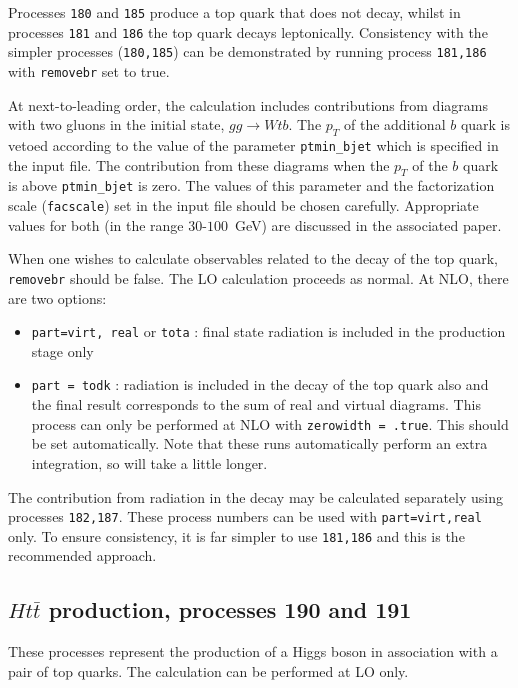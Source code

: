 \documentclass[12pt]{article}
\begin{document}
Processes {\tt 180} and {\tt 185} produce a top quark that does not decay,
whilst in processes {\tt 181} and {\tt 186} the top quark decays leptonically.
Consistency with
the simpler processes ({\tt 180,185}) can be demonstrated by running process
{\tt 181,186} with {\tt removebr} set to true.

At next-to-leading order, the calculation includes contributions from diagrams
with two gluons in the initial state, $gg \rightarrow Wtb$. The $p_T$ of the
additional $b$ quark is vetoed according to the value of the parameter
{\tt ptmin\_bjet} which is specified in the input file. The contribution from
these diagrams when the $p_T$ of the $b$ quark is above {\tt ptmin\_bjet}
is zero. The values of this parameter and the factorization scale ({\tt facscale})
set in the input file should be chosen carefully. Appropriate values for both
(in the range $30$-$100$~GeV) are discussed in the associated paper.

When one wishes to calculate observables related to the decay of the top
quark, {\tt removebr} should be false.
The LO calculation proceeds as normal. At NLO, there are two options:
\begin{itemize}
\item {\tt part=virt, real} or {\tt tota} : final state radiation is included
in the production stage only
\item {\tt part = todk} : radiation is included in the decay of the top
quark also and the final result corresponds to the sum of real and virtual
diagrams. This process can only be performed at NLO with 
{\tt zerowidth = .true}. This should be set automatically.
Note that these runs automatically perform an extra integration, so
will take a little longer.
\end{itemize}

The contribution from radiation in the decay may be calculated separately using
processes {\tt 182,187}. These process numbers can be used with {\tt part=virt,real}
only. To ensure consistency, it is far simpler to use {\tt 181,186}
and this is the recommended approach.

\subsection{$Ht{\bar t}$ production, processes 190 and 191}
\label{subsec:htt}

These processes represent the production of a Higgs boson in association
with a pair of top quarks. The calculation can be performed at LO only.
\end{document}

